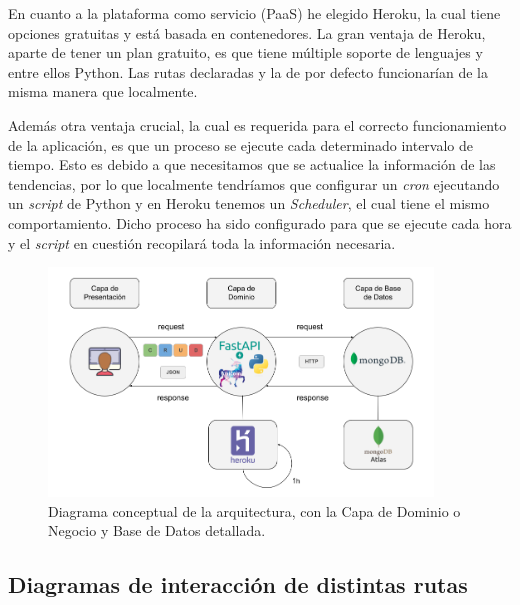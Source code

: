 En cuanto a la plataforma como servicio (\ac{PaaS}) he elegido Heroku, la cual tiene opciones gratuitas y está basada en contenedores. La gran ventaja de Heroku, aparte de tener un plan gratuito, es que tiene múltiple soporte de lenguajes y entre ellos Python. Las rutas declaradas y la de por defecto funcionarían de la misma manera que localmente. \cite{heroku-manual}

\vspace{0.3cm}

Además otra ventaja crucial, la cual es requerida para el correcto funcionamiento de la aplicación, es que un proceso se ejecute cada determinado intervalo de tiempo. Esto es debido a que necesitamos que se actualice la información de las tendencias, por lo que localmente tendríamos que configurar un \textit{cron} ejecutando un \textit{script} de Python y en Heroku tenemos un \textit{Scheduler}, el cual tiene el mismo comportamiento. Dicho proceso ha sido configurado para que se ejecute cada hora y el \textit{script} en cuestión recopilará toda la información necesaria.

\vspace{0.3cm}

\begin{figure}[H]
    \centering
    \myfloatalign
    \includegraphics[width=0.91\textwidth]{gfx/DiagramaRutas2.png}
    \caption[Diagrama conceptual con más detalle (2)]{Diagrama conceptual de la arquitectura, con la Capa de Dominio o Negocio y Base de Datos detallada.}\label{gfx:DiagramaRutas2}
\end{figure}

\subsection{Diagramas de interacción de distintas rutas}

